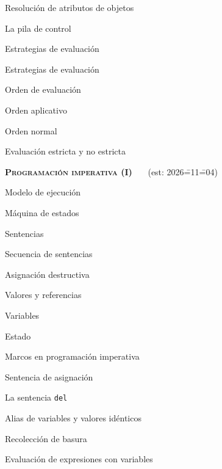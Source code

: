 \begin{longenum}
\begin{longenum}
\begin{longenum}
\begin{longenum}
            \end{longenum}
            \item Resolución de atributos de objetos
        \end{longenum}
        \item La pila de control
        \item Estrategias de evaluación \opcional\
        \begin{longenum}
            \item Estrategias de evaluación
            \item Orden de evaluación
            \begin{longenum}
                \item Orden aplicativo
                \item Orden normal
            \end{longenum}
            \item Evaluación estricta y no estricta
        \end{longenum}
    \end{longenum}
    \item \textbf{\textsc{Programación imperativa (I)}} \ce{1e}\ \ev1\ \ra1\ (est: 2026\==11\==04)
    \begin{longenum}
        \item Modelo de ejecución
        \begin{longenum}
            \item Máquina de estados
            \item Sentencias
            \item Secuencia de sentencias
        \end{longenum}
        \item Asignación destructiva
        \begin{longenum}
            \item Valores y referencias
            \item Variables
            \item Estado
            \item Marcos en programación imperativa
            \item Sentencia de asignación
            \item La sentencia \texttt{del}
            \item Alias de variables y valores idénticos
            \item Recolección de basura
            \item Evaluación de expresiones con variables

\end{longenum}
\end{longenum}
\end{longenum}
